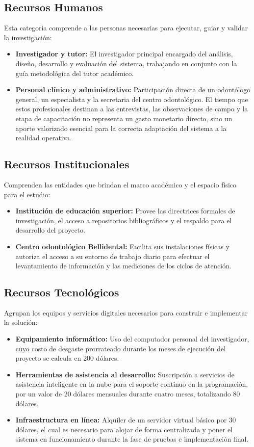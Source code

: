 
\subsection{Recursos Humanos}
Esta categoría comprende a las personas necesarias para ejecutar, guiar y validar la investigación:
\begin{itemize}
    \item \textbf{Investigador y tutor:} El investigador principal encargado del análisis, diseño, desarrollo y evaluación del sistema, trabajando en conjunto con la guía metodológica del tutor académico.
    \item \textbf{Personal clínico y administrativo:} Participación directa de un odontólogo general, un especialista y la secretaria del centro odontológico. El tiempo que estos profesionales destinan a las entrevistas, las observaciones de campo y la etapa de capacitación no representa un gasto monetario directo, sino un aporte valorizado esencial para la correcta adaptación del sistema a la realidad operativa.
\end{itemize}

\subsection{Recursos Institucionales}
Comprenden las entidades que brindan el marco académico y el espacio físico para el estudio:
\begin{itemize}
    \item \textbf{Institución de educación superior:} Provee las directrices formales de investigación, el acceso a repositorios bibliográficos y el respaldo para el desarrollo del proyecto.
    \item \textbf{Centro odontológico Bellidental:} Facilita sus instalaciones físicas y autoriza el acceso a su entorno de trabajo diario para efectuar el levantamiento de información y las mediciones de los ciclos de atención.
\end{itemize}

\subsection{Recursos Tecnológicos}
Agrupan los equipos y servicios digitales necesarios para construir e implementar la solución:
\begin{itemize}
    \item \textbf{Equipamiento informático:} Uso del computador personal del investigador, cuyo costo de desgaste prorrateado durante los meses de ejecución del proyecto se calcula en 200 dólares.
    \item \textbf{Herramientas de asistencia al desarrollo:} Suscripción a servicios de asistencia inteligente en la nube para el soporte continuo en la programación, por un valor de 20 dólares mensuales durante cuatro meses, totalizando 80 dólares.
    \item \textbf{Infraestructura en línea:} Alquiler de un servidor virtual básico por 30 dólares, el cual es necesario para alojar de forma centralizada y poner el sistema en funcionamiento durante la fase de pruebas e implementación final.
\end{itemize}

